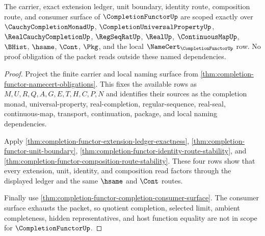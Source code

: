 \begin{theorem}
\label{thm:completion-functor-scoped-dependency-spine}
The carrier, exact extension ledger, unit boundary, identity route, composition route, and consumer surface of $\CompletionFunctorUp$ are scoped exactly over $\CauchyCompletionMonadUp$, $\CompletionUniversalPropertyUp$, $\RealCauchyCompletionUp$, $\RegSeqRatUp$, $\RealUp$, $\ContinuousMapUp$, $\BHist$, $\hsame$, $\Cont$, $\Pkg$, and the local $\NameCert_{\CompletionFunctorUp}$ row. No proof obligation of the packet reads outside these named dependencies.
\end{theorem}
\begin{proof}
Project the finite carrier and local naming surface from \autoref{thm:completion-functor-namecert-obligations}. This fixes the available rows as $M,U,R,Q,A,G,E,T,H,C,P,N$ and identifies their sources as the completion monad, universal-property, real-completion, regular-sequence, real-seal, continuous-map, transport, continuation, package, and local naming dependencies.

Apply \autoref{thm:completion-functor-extension-ledger-exactness}, \autoref{thm:completion-functor-unit-boundary}, \autoref{thm:completion-functor-identity-route-stability}, and \autoref{thm:completion-functor-composition-route-stability}. These four rows show that every extension, unit, identity, and composition read factors through the displayed ledger and the same $\hsame$ and $\Cont$ routes.

Finally use \autoref{thm:completion-functor-completion-consumer-surface}. The consumer surface exhausts the packet, so quotient completion, selected limit, ambient completeness, hidden representatives, and host function equality are not in scope for $\CompletionFunctorUp$.
\end{proof}

